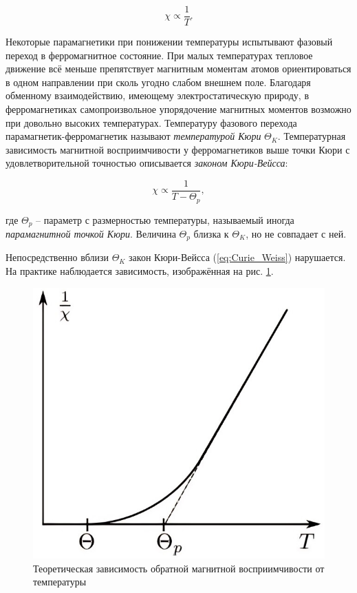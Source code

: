 \documentclass[a4paper, 12pt]{article}
\begin{document}
    \begin{equation}
        \chi \propto \frac{1}{T}.
    \end{equation}
    
    Некоторые парамагнетики при понижении температуры испытывают фазовый переход в ферромагнитное состояние. При малых температурах тепловое движение всё меньше препятствует магнитным моментам атомов ориентироваться в одном направлении при сколь угодно слабом внешнем поле. Благодаря обменному взаимодействию, имеющему электростатическую природу, в ферромагнетиках самопроизвольное упорядочение магнитных моментов возможно при довольно высоких температурах. Температуру фазового перехода парамагнетик-ферромагнетик называют \textit{температурой Кюри} $\Theta_K$. Температурная зависимость магнитной восприимчивости у ферромагнетиков выше точки Кюри с удовлетворительной точностью описывается \textit{законом Кюри-Вейсса}:

    \begin{equation}
        \chi \propto \frac{1}{T - \Theta_p},
        \label{eq:Curie_Weiss}
    \end{equation}
    
    где $\Theta_p$ -- параметр с размерностью температуры, называемый иногда \textit{парамагнитной точкой Кюри}. Величина $\Theta_p$ близка к $\Theta_K$, но не совпадает с ней.
    
    Непосредственно вблизи $\Theta_K$ закон Кюри-Вейсса (\ref{eq:Curie_Weiss}) нарушается. На практике наблюдается зависимость, изображённая на рис. \ref{gd:Curie_Weiss}.

    \begin{figure}[H]
        \centering
        \includegraphics[scale = 0.7]{images/Curie_Weiss.png}
        \caption{Теоретическая зависимость обратной магнитной восприимчивости от температуры}
        \label{gd:Curie_Weiss}
    \end{figure}
    
\end{document}
